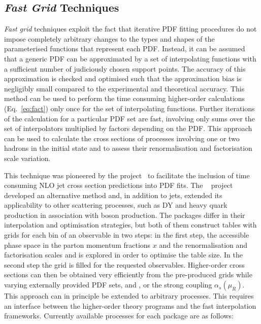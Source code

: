 \subsection{\emph{Fast Grid} Techniques}

  \emph{Fast grid} techniques exploit the fact that iterative PDF fitting
  procedures do not impose completely arbitrary changes to the types
  and shapes of the parameterised functions that represent each PDF\@.
  Instead, it can be assumed that a generic PDF can be approximated by
  a set of interpolating functions with a sufficient number of
 judiciously chosen support points. The 
  accuracy of this approximation is checked and optimised 
 such that the approximation bias is negligibly
  small compared to the experimental and theoretical accuracy. 
   This method can be used to perform
  the time consuming higher-order calculations (Eq.~\ref{eq:fact})
  only once for the set of interpolating functions. 
  Further iterations of the calculation for
  a particular PDF set are fast, involving only sums over
  the set of interpolators multiplied by factors depending on the
  PDF\@. This approach can be used to calculate the cross sections 
  of processes involving one or two hadrons in the initial state and to
  assess their renormalisation and factorisation scale variation.

  This technique was pioneered by the \fastnlo
  project~\cite{Kluge:2006xs} to facilitate the inclusion of
   time consuming NLO jet cross section predictions into PDF fits.
  The \applgrid~\cite{Carli:2010rw} project developed an alternative method
  and, in addition to jets, extended its applicability to other scattering processes, 
  such as DY and heavy quark production in association with boson production.
  The packages differ in their interpolation
  and optimisation strategies, but both of them construct tables with
  grids for each bin of an observable in two steps: in the first step,
  the accessible phase space in the parton momentum fractions $x$ and
  the renormalisation and factorisation scales \mur and \muf is
  explored in order to optimise the table size. In the second step
  the grid is filled for the
  requested observables. Higher-order cross sections can then be
  obtained very efficiently from the pre-produced grids while varying
  externally provided PDF sets, \mur and \muf, or the strong coupling
  $\alpha_s(\mu_R)$. This approach can in principle be extended to arbitrary
  processes. This requires an interface between the
  higher-order theory programs and the fast interpolation
  frameworks. Currently available processes for each package are as follows:

